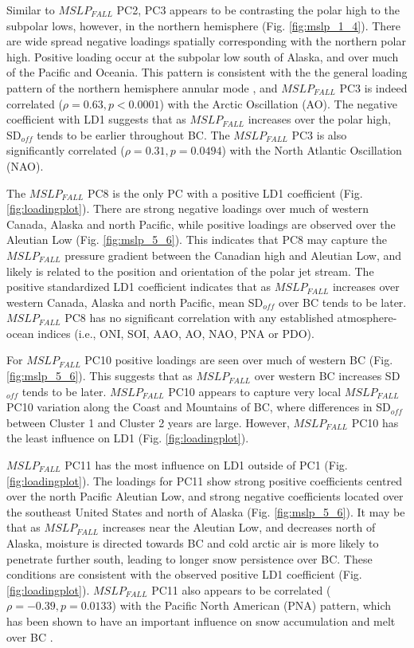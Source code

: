 \documentclass{tATO2e}
\newcommand{\sdoff}{SD$_{off}$}
\begin{document}
\par
Similar to $MSLP_{FALL}$ PC2, PC3 appears to be contrasting the polar high to the subpolar lows, however, in the northern hemisphere (Fig. \ref{fig:mslp_1_4}). There are wide spread negative loadings spatially corresponding with the northern polar high. Positive loading occur at the subpolar low south of Alaska, and over much of the Pacific and Oceania. This pattern is consistent with the the general loading pattern of the northern hemisphere annular mode \citep{Thompson2000}, and $MSLP_{FALL}$ PC3 is indeed correlated ($\rho = 0.63, p < 0.0001$) with the Arctic Oscillation (AO). The negative coefficient with LD1 suggests that as $MSLP_{FALL}$ increases over the polar high, \sdoff{} tends to be earlier throughout BC. The $MSLP_{FALL}$ PC3 is also significantly correlated ($\rho = 0.31, p = 0.0494$) with the North Atlantic Oscillation (NAO).  
\par
The $MSLP_{FALL}$ PC8 is the only PC with a positive LD1 coefficient (Fig. \ref{fig:loadingplot}). There are strong negative loadings over much of western Canada, Alaska and north Pacific, while positive loadings are observed over the Aleutian Low (Fig. \ref{fig:mslp_5_6}). This indicates that PC8 may capture the $MSLP_{FALL}$ pressure gradient between the Canadian high and Aleutian Low, and likely is related to the position and orientation of the polar jet stream. The positive standardized LD1 coefficient indicates that as $MSLP_{FALL}$ increases over western Canada, Alaska and north Pacific, mean \sdoff{} over BC tends to be later. $MSLP_{FALL}$ PC8 has no significant correlation with any established atmosphere-ocean indices (i.e., ONI, SOI, AAO, AO, NAO, PNA or PDO). 
\par
For $MSLP_{FALL}$ PC10 positive loadings are seen over much of western BC (Fig. \ref{fig:mslp_5_6}). This suggests that as $MSLP_{FALL}$ over western BC increases \sdoff{} tends to be later. $MSLP_{FALL}$ PC10 appears to capture very local  $MSLP_{FALL}$ PC10 variation along the Coast and Mountains of BC, where differences in \sdoff{} between Cluster 1 and Cluster 2 years are large. However, $MSLP_{FALL}$ PC10 has the least influence on LD1 (Fig. \ref{fig:loadingplot}). 
\par
$MSLP_{FALL}$ PC11 has the most influence on LD1 outside of PC1 (Fig. \ref{fig:loadingplot}). The loadings for PC11 show strong positive coefficients centred over the north Pacific Aleutian Low, and strong negative coefficients located over the southeast United States and north of Alaska (Fig. \ref{fig:mslp_5_6}). It may be that as $MSLP_{FALL}$ increases near the Aleutian Low, and decreases north of Alaska, moisture is directed towards BC and cold arctic air is more likely to penetrate further south, leading to longer snow persistence over BC. These conditions are consistent with the observed positive LD1 coefficient (Fig. \ref{fig:loadingplot}). $MSLP_{FALL}$ PC11 also appears to be correlated ($\rho = -0.39, p = 0.0133$) with the Pacific North American (PNA) pattern, which has been shown to have an important influence on snow accumulation and melt over BC \citep{Moore1996-xr}.
\end{document}
